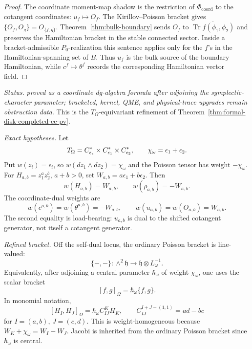 \begin{proof}
		  The coordinate moment-map shadow is the restriction of
	  \(\Phi_{\mathrm{coord}}\) to the cotangent
  coordinates: \(u_f\mapsto O_f\).  The Kirillov--Poisson bracket gives
  \(\{O_f,O_g\}=O_{\{f,g\}}\).  Theorem~\ref{thm:bulk-boundary} sends
  \(O_f\) to
  \(\overline{\operatorname{Tr}f(\phi_1,\phi_2)}\) and preserves the
  Hamiltonian bracket in the stable connected sector.  Inside a
  bracket-admissible \(P_0\)-realization this sentence applies only for
  the \(f\)'s in the Hamiltonian-spanning set of \(B\).  Thus \(u_f\) is
  the bulk source of the boundary Hamiltonian, while \(c^f\mapsto\theta^f\)
  records the corresponding Hamiltonian vector field.
\end{proof}

\begin{stmt}\label{thm:lane-equivariant-ce-pv-refined-bracket}
  \emph{Status.} \emph{proved as a coordinate dg-algebra formula after
  adjoining the symplectic-character parameter; bracketed, kernel, QME,
  and physical-trace upgrades remain obstruction data}.  This is the
  \(T_\Omega\)-equivariant refinement of
  Theorem~\ref{thm:formal-disk-completed-ce-pv}.

  \emph{Exact hypotheses.} Let
  \[
    T_\Omega=C^*_{\epsilon_s}\times
    C^*_{\epsilon_1}\times C^*_{\epsilon_2},
    \qquad
    \chi_\omega=\epsilon_1+\epsilon_2 .
  \]
  Put \(w(z_i)=\epsilon_i\), so
  \(w(dz_1\wedge dz_2)=\chi_\omega\) and the Poisson tensor has weight
  \(-\chi_\omega\).  For \(H_{a,b}=z_1^az_2^b\), \(a+b>0\), set
  \(W_{a,b}=a\epsilon_1+b\epsilon_2\).  Then
  \[
    w(H_{a,b})=W_{a,b},\qquad
    w(\rho_{a,b})=-W_{a,b}.
  \]
  The coordinate-dual weights are
  \[
    w(c^{a,b})=w(\theta^{a,b})=-W_{a,b},
    \qquad
    w(u_{a,b})=w(O_{a,b})=W_{a,b}.
  \]
  The second equality is load-bearing: \(u_{a,b}\) is dual to the
  shifted cotangent generator, not itself a cotangent generator.

  \emph{Refined bracket.} Off the self-dual locus, the ordinary Poisson
  bracket is line-valued:
  \[
    \{-,-\}\colon
    \wedge^2\mathfrak h\longrightarrow
    \mathfrak h\otimes L_\omega^{-1}.
  \]
  Equivalently, after adjoining a central parameter
  \(\hbar_\omega\) of weight \(\chi_\omega\), one uses the scalar
  bracket
  \[
    [f,g]_\Omega=\hbar_\omega\{f,g\}.
  \]
  In monomial notation,
  \[
    [H_I,H_J]_\Omega
    =
    \hbar_\omega C^K_{IJ}H_K,
    \qquad
    C^{I+J-(1,1)}_{IJ}=ad-bc
  \]
  for \(I=(a,b)\), \(J=(c,d)\).  This is weight-homogeneous because
  \(W_K+\chi_\omega=W_I+W_J\).  Jacobi is inherited from the ordinary
  Poisson bracket since \(\hbar_\omega\) is central.


\end{stmt}
